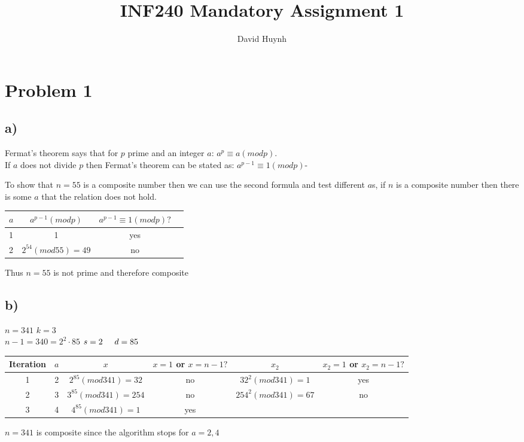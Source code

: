 \documentclass{article}
\begin{document}
\title{INF240 Mandatory Assignment 1}
\author{David Huynh}

\maketitle

\section*{Problem 1}

\subsection*{a)}
Fermat's theorem says that for $p$ prime and an integer $a$: $a^{p} \equiv a (mod p)$.\\
If $a$ does not divide $p$ then Fermat's theorem can be stated as: $a^{p-1} \equiv 1 (mod p)$-

To show that $n=55$ is a composite number then we can use the second formula and test different $a$s, if $n$ is a composite number then there is some $a$ that the relation does not hold.

\begin{tabular}{l | c | c | r}
$a$ & $a^{p-1} (mod p)$ & $a^{p-1} \equiv 1 (mod p)?$ \\ \hline

1 & 1 & yes\\
2 & $2^{54} (mod 55) = 49$ & no
\end{tabular}

Thus $n=55$ is not prime and therefore composite

\subsection*{b)}

$n=341$ \hspace{5 mm} $k=3$\\
$n-1=340= 2^{2} \cdotp 85$ \hspace{5 mm} $s=2 \hspace{5mm} d=85$

\begin{tabular}{c | c | c | c | c | c}
Iteration & $a$ & $x$ & $x=1$ or $x=n-1?$ & $x_{2}$ & $x_{2}=1$ or $x_{2}=n-1?$\\ \hline

1 & 2 & $2^{85} (mod 341) = 32$ & no & $32^{2} (mod 341) = 1$ & yes\\
2 & 3 & $3^{85} (mod 341) = 254$ & no & $254^{2} (mod 341) = 67$ & no\\
3 & 4 & $4^{85} (mod 341) = 1$ & yes &  &
\end{tabular}

$n=341$ is composite since the algorithm stops for $a=2,4$
\end{document}
